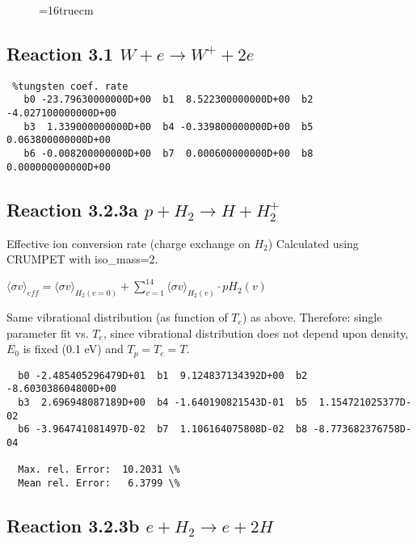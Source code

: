 \documentclass[12pt,dvipdfmx]{article}
\begin{document}
\begin{figure} \label{2.26B}
\epsfxsize=16truecm
\end{figure}

\subsection{
Reaction 3.1 $W + e \rightarrow W^+ + 2e $ }

\begin{small}\begin{verbatim} %tungsten coef. rate
   b0 -23.79630000000D+00  b1  8.522300000000D+00  b2 -4.027100000000D+00
   b3  1.339000000000D+00  b4 -0.339800000000D+00  b5  0.063800000000D+00
   b6 -0.008200000000D+00  b7  0.000600000000D+00  b8  0.000000000000D+00
\end{verbatim}\end{small}

\newpage

\subsection{
Reaction 3.2.3a   $p + H_2 \rightarrow H + H_2^+  $
}

  Effective ion conversion rate (charge exchange on $H_2$) Calculated using CRUMPET with iso_mass=2.

  $ \langle\sigma v \rangle_{eff} = \langle\sigma v \rangle_{H_2(v=0)} + \sum_{v=1}^{14}
\langle\sigma v \rangle_{H_2(v)} \cdot pH_2(v) $

  Same vibrational distribution (as function of $T_e$) as above.
  Therefore:
  single parameter fit vs. $T_e$,
  since vibrational distribution does not depend upon density, $E_0$ is fixed
  (0.1 eV) and $T_p = T_e = T$.

\begin{small}\begin{verbatim}
  b0 -2.485405296479D+01  b1  9.124837134392D+00  b2 -8.603038604800D+00
  b3  2.696948087189D+00  b4 -1.640190821543D-01  b5  1.154721025377D-02
  b6 -3.964741081497D-02  b7  1.106164075808D-02  b8 -8.773682376758D-04

  Max. rel. Error:  10.2031 \%
  Mean rel. Error:   6.3799 \%

\end{verbatim}\end{small}
\newpage

\subsection{
Reaction 3.2.3b   $e + H_2 \rightarrow e + 2H  $
}
\end{document}
